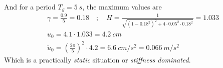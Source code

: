 \begin{Answer}[ref={frame_ground_acceleration}]
And for a period $T_g=\SI{5}{s}$, the maximum values are
\begin{align*}
&\gamma = \frac{0.9}{5} = 0.18 \quad ; \quad
H = \frac{1}{\sqrt{(1-0.18^2)^2 + 4\cdot 0.05^2\cdot 0.18^2}} = 1.033 \\
&u_0 = 4.1\cdot 1.033 = \SI{4.2}{cm} \\
&\ddot{u}_0 = \left(\frac{2\pi}{5}\right)^2 \cdot 4.2 = \SI{6.6}{cm/s^2} = \SI{0.066}{m/s^2}
\end{align*}
Which is a practically \emph{static} situation or \emph{stiffness dominated}.

\end{Answer}
